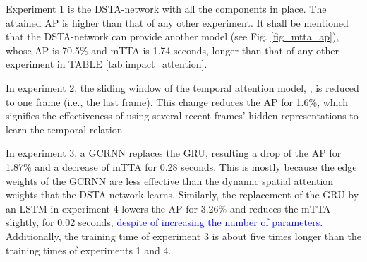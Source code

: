 \documentclass[journal]{IEEEtran}
\begin{document}
\begin{table}[ht!]
\renewcommand{\arraystretch}{1.3}
    \caption{Ablation study on the DAD dataset}
    \label{tab:impact_attention}
    \centering
\end{table}

Experiment 1 is the DSTA-network with all the components in place. The attained AP is higher than that of any other experiment. It shall be mentioned that the DSTA-network can provide another model (see Fig. \ref{fig_mtta_ap}), whose AP is 70.5\% and mTTA is 1.74 seconds, longer than that of any other experiment in TABLE \ref{tab:impact_attention}. 

In experiment 2, the sliding window of the temporal attention model, , is reduced to one frame (i.e., the last frame). This change reduces the AP for 1.6\%, which signifies the effectiveness of using several recent frames' hidden representations to learn the temporal relation. 

In experiment 3, a GCRNN replaces the GRU, resulting a drop of the AP for 1.87\% and a decrease of mTTA for 0.28 seconds. This is mostly because the edge weights of the GCRNN are less effective than the dynamic spatial attention weights that the DSTA-network learns. Similarly, the replacement of the GRU by an LSTM in experiment 4 lowers the AP for 3.26\% and reduces the mTTA slightly, for 0.02 seconds, \textcolor{blue}{despite of increasing the number of parameters.} Additionally, the training time of experiment 3 is about five times longer than the training times of experiments 1 and 4.
\end{document}
